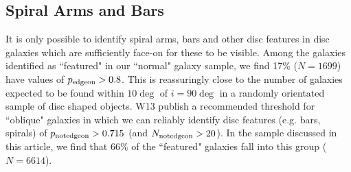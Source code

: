 \documentclass[usenatbib]{mn2e}
\newcommand{\comment}[2][todo]{{\color{#1}[[{\bf #2}]]}}
\begin{document}


\subsection{Spiral Arms and Bars}
 
  It is only possible to identify spiral arms, bars and other disc features in disc galaxies which are sufficiently face-on for these to be visible.  Among the galaxies identified as ``featured" in our ``normal" galaxy sample, we find {17\% ($N=1 699$)} have values of $p_{\rm edge on}>0.8$. This is reassuringly close to the number of galaxies expected to be found within $10\deg$ of $i=90\deg$ in a randomly orientated sample of disc shaped objects. %
W13 publish a recommended threshold for ``oblique" galaxies in which we can reliably identify disc features (e.g. bars, spirals) of $p_{\rm not edge on}>0.715$ (and $N_{\rm not edge on}>20$). In the sample discussed in this article, we find that {66}\% of the ``featured" galaxies fall into this group {($N=6 614$)}. 
 
\end{document}
